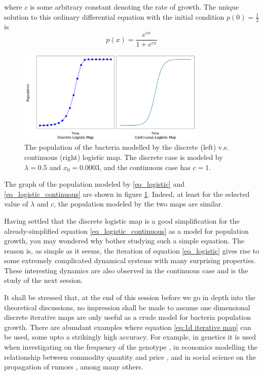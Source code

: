 where $c$ is some arbitrary constant denoting the rate of growth. 
The unique solution to this ordinary differential equation with the initial condition $p(0) = \frac{1}{2}$ is 
$$
p(x) = \frac{e^{cx}}{1+e^{cx}}
$$
\begin{figure}
	\centering
	\includegraphics[width=0.8\textwidth]{./figures/con_vs_discrete_logistic_map.png}
	\caption{The population of the bacteria modelled by the discrete (left) v.s. continuous (right) logistic map. 
	The discrete case is modeled by $\lambda = 0.5$ and $x_0 = 0.0003$, and the continuous case has $c=1$.}
	\label{fig:con_vs_discrete}
\end{figure}

The graph of the population modeled by \eqref{eq_logistic} and \eqref{eq_logistic_continuous} are shown in figure \ref{fig:con_vs_discrete}.
Indeed, at least for the selected value of $\lambda$ and $c$, the population modeled by the two maps are similar.

Having settled that the discrete logistic map is a good simplification for the already-simplified equation \ref{eq_logistic_continuous} as a model for population growth, you may wondered why bother studying such a simple equation. 
The reason is, as simple as it seems, the iteration of equation \ref{eq_logistic} gives rise to some extremely complicated dynamical systems with many surprising properties. 
These interesting dynamics are also observed in the continuous case and is the study of the next session.

It shall be stressed that, at the end of this session before we go in depth into the theoretical discussions, no impression shall be made to assume one dimensional discrete iterative maps are only useful as a crude model for bacteria population growth. 
There are abundant examples where equation \eqref{eq:1d iterative map} can be used, some upto a strikingly high accuracy. 
For example, in genetics it is used when investigating on the frequency of the genotype \cite{genotype}, in economics modelling the relationship between commodity quantity and price \cite{economics}, and in social science on the propagation of rumors \cite{social_science}, among many others.


